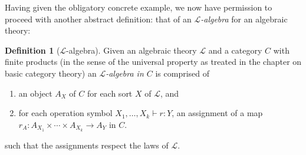 \documentclass[12pt,twoside]{reedthesis}
\theoremstyle{definition}
\newtheorem{definition}{Definition}
\theoremstyle{remark}
\theoremstyle{plain}
\begin{document}
Having given the obligatory concrete example, we now have permission to proceed
with another abstract definition: that of an \emph{$\mathcal{L}$-algebra} for an
algebraic theory:

\begin{definition}[$\mathcal{L}$-algebra]\label{def:algebra}
  Given an algebraic theory $\mathcal{L}$ and a category $C$ with finite
  products (in the sense of the universal property as treated in the chapter on
  basic category theory) an \emph{$\mathcal{L}$-algebra in $C$} is comprised of
  \begin{enumerate}
    \item an object $A_{X}$ of $C$ for each sort $X$ of $\mathcal{L}$, and
    \item for each operation symbol $X_{1}, \dots , X_{k} \vdash r : Y$, an
          assignment of a map \(r_{A} : A_{X_{1}} \times \cdots \times A_{X_{k}} \rightarrow A_{Y}\) in
          $C$.
  \end{enumerate}
  such that the assignments respect the laws of $\mathcal{L}$.
\end{definition}
\end{document}
